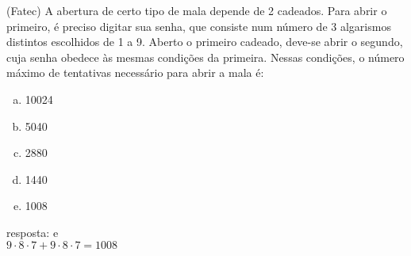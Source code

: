 \begin{ex}
(Fatec) A abertura de certo tipo de mala depende de 2 cadeados. Para abrir o primeiro, é preciso digitar sua senha, que consiste num número de 3 algarismos distintos escolhidos de 1 a 9. Aberto o primeiro cadeado, deve-se abrir o segundo, cuja senha obedece às mesmas condições da primeira. Nessas condições, o número máximo de tentativas  necessário para abrir a mala é:
   \begin{enumerate}[(a)]
   \item 10024
   \item 5040
   \item 2880
   \item 1440
   \item 1008
   \end{enumerate}
    \begin{sol}
     resposta: e \\
     $9\cdot8\cdot7+9\cdot8\cdot7=1008$
    \end{sol}
\end{ex}